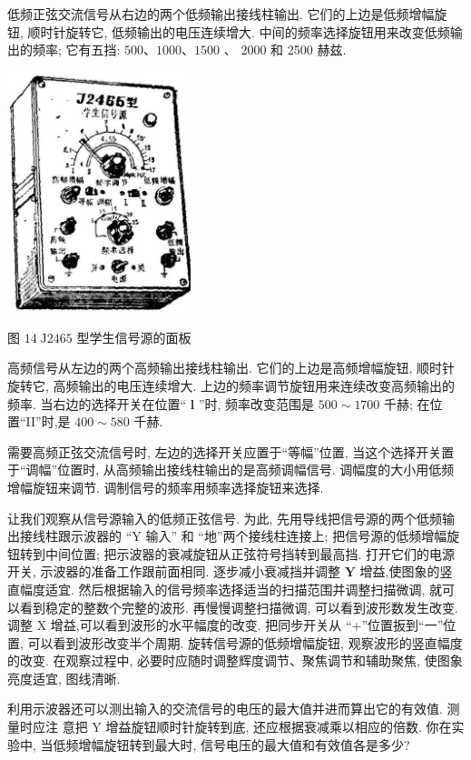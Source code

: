 \documentclass[10pt]{article}
\begin{document}
低频正弦交流信号从右边的两个低频输出接线柱输出. 它们的上边是低频增幅旋 钮, 顺时针旋转它, 低频输出的电压连续增大. 中间的频率选择旋钮用来改变低频输出的频率; 它有五挡: \({500}\text{、}{1000}\text{、}{1500}\) 、 2000 和 2500 赫兹.

\begin{center}
\includegraphics[max width=0.4\textwidth]{images/01913056-1f15-74d8-9184-9aab52c9d66b_387_590705.jpg}
\end{center}

图 \({14}\mathrm{\;J}{2465}\) 型学生信号源的面板

高频信号从左边的两个高频输出接线柱输出. 它们的上边是高频增幅旋钮, 顺时针旋转它, 高频输出的电压连续增大. 上边的频率调节旋钮用来连续改变高频输出的频率. 当右边的选择开关在位置“ \(\mathbf{l}\) ”时, 频率改变范围是 \({500} \sim {1700}\) 千赫; 在位置“II”时,是 \({400} \sim {580}\) 千赫.

需要高频正弦交流信号时, 左边的选择开关应置于“等幅”位置, 当这个选择开关置于“调幅”位置时, 从高频输出接线柱输出的是高频调幅信号. 调幅度的大小用低频增幅旋钮来调节. 调制信号的频率用频率选择旋钮来选择.

让我们观察从信号源输入的低频正弦信号. 为此, 先用导线把信号源的两个低频输出接线柱跟示波器的 “Y 输入” 和 “地”两个接线柱连接上; 把信号源的低频增幅旋钮转到中间位置; 把示波器的衰减旋钮从正弦符号挡转到最高挡. 打开它们的电源开关, 示波器的准备工作跟前面相同. 逐步减小衰减挡并调整 \(\mathbf{Y}\) 增益,使图象的竖直幅度适宜. 然后根据输入的信号频率选择适当的扫描范围并调整扫描微调, 就可以看到稳定的整数个完整的波形. 再慢慢调整扫描微调, 可以看到波形数发生改变. 调整 \(\mathrm{X}\) 增益,可以看到波形的水平幅度的改变. 把同步开关从 “+”位置扳到“一”位置, 可以看到波形改变半个周期. 旋转信号源的低频增幅旋钮, 观察波形的竖直幅度的改变. 在观察过程中, 必要时应随时调整辉度调节、聚焦调节和辅助聚焦, 使图象亮度适宜, 图线清晰.

利用示波器还可以测出输入的交流信号的电压的最大值并进而算出它的有效值. 测量时应注 意把 \(\mathrm{Y}\) 增益旋钮顺时针旋转到底, 还应根据衰减乘以相应的倍数. 你在实验中, 当低频增幅旋钮转到最大时, 信号电压的最大值和有效值各是多少?
\end{document}
